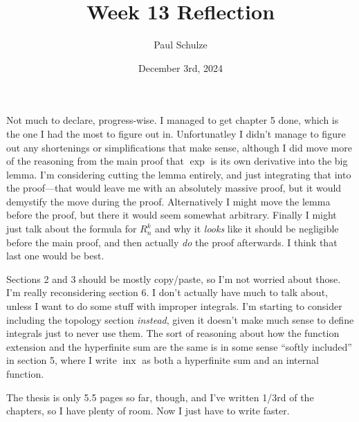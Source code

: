 \documentclass{article}
\title{Week 13 Reflection}
\author{Paul Schulze}
\date{December 3rd, 2024}
\DeclareMathOperator{\inx}{inx}
\theoremstyle{definition}
\begin{document}
\maketitle

Not much to declare, progress-wise. I managed to get chapter 5 done, which is the one I had the most to figure out in. Unfortunatley I didn't manage to figure out any shortenings or simplifications that make sense, although I did move more of the reasoning from the main proof that $\exp$ is its own derivative into the big lemma. I'm considering cutting the lemma entirely, and just integrating that into the proof---that would leave me with an absolutely massive proof, but it would demystify the move during the proof. Alternatively I might move the lemma before the proof, but there it would seem somewhat arbitrary. Finally I might just talk about the formula for $R_n^k$ and why it \textit{looks} like it should be negligible before the main proof, and then actually \textit{do} the proof afterwards. I think that last one would be best.

Sections 2 and 3 should be mostly copy/paste, so I'm not worried about those. I'm really reconsidering section 6. I don't actually have much to talk about, unless I want to do some stuff with improper integrals. I'm starting to consider including the topology section \textit{instead}, given it doesn't make much sense to define integrals just to never use them. The sort of reasoning about how the function extension and the hyperfinite sum are the same is in some sense ``softly included'' in section 5, where I write $\inx$ as both a hyperfinite sum and an internal function.

The thesis is only 5.5 pages so far, though, and I've written 1/3rd of the chapters, so I have plenty of room. Now I just have to write faster.
\end{document}
